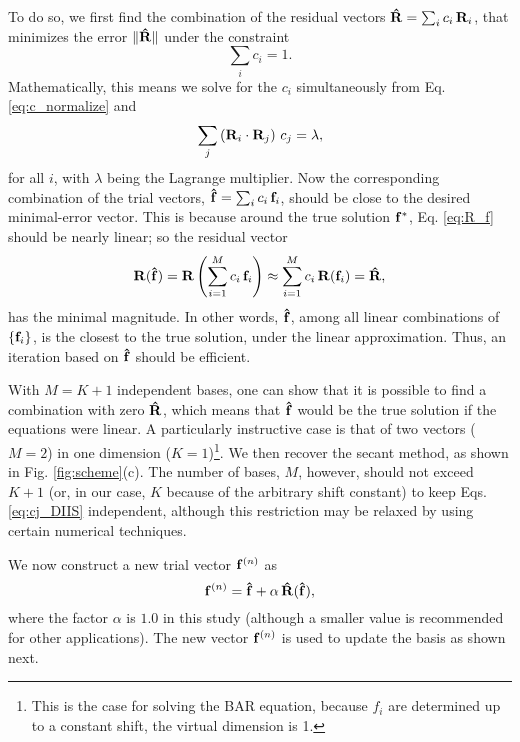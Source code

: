 \documentclass[reprint,aip,jcp,superscriptaddress]{revtex4-1}
\begin{document}
To do so, we first find the combination of the residual vectors
$\mathbf{\hat R} = \sum_i c_i \, \mathbf{R}_i$,
that minimizes the error
$\| \mathbf{\hat R} \|$
under the constraint
\begin{equation}
  \sum_i c_i = 1.
  \label{eq:c_normalize}
\end{equation}
%
Mathematically,
this means  we solve for the $c_i$ simultaneously
from Eq. \eqref{eq:c_normalize} and
%
\begin{equation}
  \sum_j \left( \mathbf{R}_i \cdot \mathbf{R}_j \right) \, c_j = \lambda,
  \label{eq:cj_DIIS}
\end{equation}
%
for all $i$,
with $\lambda$ being the Lagrange multiplier.
%
Now the corresponding combination
of the trial vectors,
$\mathbf{\hat f} = \sum_i c_i \, \mathbf{f}_i$,
should be close to the desired minimal-error vector.
%
This is because
around the true solution $\mathbf{f}^*$,
Eq. \eqref{eq:R_f} should be nearly linear;
so the residual vector
%
\[
\mathbf{R}(\mathbf{\hat f})
=
\mathbf{R}\left(
  \sum_{i=1}^M c_i \, \mathbf{f}_i
\right)
\approx
\sum_{i=1}^M c_i \, \mathbf{R}(\mathbf{f}_i)
=\mathbf{\hat R},
\]
%
has the minimal magnitude.
%
In other words,
$\mathbf{\hat f}$,
among all linear combinations of $\{ \mathbf{f}_i \}$,
is the closest to the true solution,
under the linear approximation.
%
Thus,
an iteration based on
$\mathbf{\hat f}$
should be efficient.



With $M = K + 1$ independent bases,
one can show that
it is possible to
find a combination with zero $\mathbf{\hat R}$,
which means that
$\mathbf{\hat f}$ would be the true solution
if the equations were linear.
%
A particularly instructive case is that of
two vectors ($M = 2$)
in one dimension ($K = 1$)\footnote{
This is the case for solving the BAR equation,
because $f_i$ are determined up to a constant shift,
the virtual dimension is 1.}.
%
We then recover
the secant method\cite{press},
as shown in Fig. \ref{fig:scheme}(c).
%
The number of bases, $M$, however,
should not exceed $K + 1$
(or, in our case, $K$
because of the arbitrary shift constant)
to keep Eqs. \eqref{eq:cj_DIIS}
independent,
%
although this restriction may be relaxed
by using certain numerical techniques\cite{
press}.




We now construct a new trial vector $\mathbf{f}^{(n)}$ as
%
\begin{equation*}
\mathbf{f}^{(n)}
=
\mathbf{\hat f}
+
\alpha \, \mathbf{\hat R}( \mathbf{\hat f} ),
\end{equation*}
%
where the factor $\alpha$ is $1.0$ in this study
(although a smaller value is recommended
for other applications\cite{kovalenko1999, howard2011}).
%
The new vector $\mathbf{f}^{(n)}$
is used to update the basis as shown next.
\end{document}
